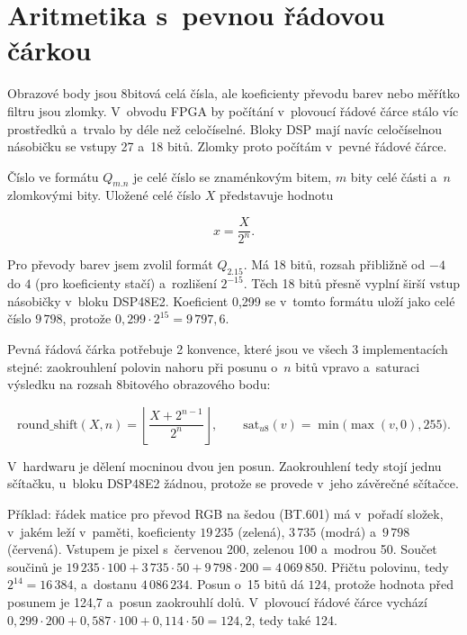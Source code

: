 
\section{Aritmetika s~pevnou řádovou čárkou}
\label{sec:aritmetika}

Obrazové body jsou 8bitová celá čísla, ale koeficienty převodu barev nebo měřítko filtru jsou zlomky. V~obvodu \ac{FPGA} by počítání v~plovoucí řádové čárce stálo víc prostředků a~trvalo by déle než celočíselné. Bloky \acs{DSP} mají navíc celočíselnou násobičku se vstupy 27 a~18 bitů. Zlomky proto počítám v~pevné řádové čárce.

Číslo ve formátu $Q_{m.n}$ je celé číslo se znaménkovým bitem, $m$ bity celé části a~$n$ zlomkovými bity. Uložené celé číslo $X$ představuje hodnotu

\begin{equation}
    x = \frac{X}{2^{n}} .
    \label{eq:q-format}
\end{equation}

Pro převody barev jsem zvolil formát $Q_{2.15}$. Má 18 bitů, rozsah přibližně od $-4$ do $4$ (pro koeficienty stačí) a~rozlišení $2^{-15}$. Těch 18 bitů přesně vyplní širší vstup násobičky v~bloku DSP48E2. Koeficient 0,299 se v~tomto formátu uloží jako celé číslo $9\,798$, protože $0{,}299 \cdot 2^{15} = 9\,797{,}6$.

Pevná řádová čárka potřebuje 2 konvence, které jsou ve všech 3 implementacích stejné: zaokrouhlení polovin nahoru při posunu o~$n$ bitů vpravo a~saturaci výsledku na rozsah 8bitového obrazového bodu:

\begin{equation}
    \mathrm{round\_shift}(X, n) = \left\lfloor \frac{X + 2^{n-1}}{2^{n}} \right\rfloor , \qquad \mathrm{sat}_{u8}(v) = \min\bigl(\max(v, 0), 255\bigr) .
    \label{eq:round-sat}
\end{equation}

V~hardwaru je dělení mocninou dvou jen posun. Zaokrouhlení tedy stojí jednu sčítačku, u~bloku DSP48E2 žádnou, protože se provede v~jeho závěrečné sčítačce.

Příklad: řádek matice pro převod RGB na šedou (BT.601) má v~pořadí složek, v~jakém leží v~paměti, koeficienty $19\,235$ (zelená), $3\,735$ (modrá) a~$9\,798$ (červená). Vstupem je pixel s~červenou 200, zelenou 100 a~modrou 50. Součet součinů je $19\,235 \cdot 100 + 3\,735 \cdot 50 + 9\,798 \cdot 200 = 4\,069\,850$. Přičtu polovinu, tedy $2^{14} = 16\,384$, a~dostanu $4\,086\,234$. Posun o~15 bitů dá $124$, protože hodnota před posunem je 124,7 a~posun zaokrouhlí dolů. V~plovoucí řádové čárce vychází $0{,}299 \cdot 200 + 0{,}587 \cdot 100 + 0{,}114 \cdot 50 = 124{,}2$, tedy také 124.

